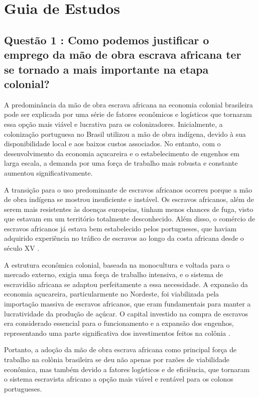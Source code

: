 \documentclass[a4paper,12pt]{article}[abntex2]
\begin{document}
\newpage
\section{\textbf{Guia de Estudos}}

\subsection{\textbf{Questão 1 : Como podemos justificar o emprego da mão de obra escrava africana ter se tornado a mais importante na etapa colonial?}}

A predominância da mão de obra escrava africana na economia colonial brasileira pode ser explicada por uma série de fatores econômicos e logísticos que tornaram essa opção mais viável e lucrativa para os colonizadores. Inicialmente, a colonização portuguesa no Brasil utilizou a mão de obra indígena, devido à sua disponibilidade local e aos baixos custos associados. No entanto, com o desenvolvimento da economia açucareira e o estabelecimento de engenhos em larga escala, a demanda por uma força de trabalho mais robusta e constante aumentou significativamente.

A transição para o uso predominante de escravos africanos ocorreu porque a mão de obra indígena se mostrou insuficiente e instável. Os escravos africanos, além de serem mais resistentes às doenças europeias, tinham menos chances de fuga, visto que estavam em um território totalmente desconhecido. Além disso, o comércio de escravos africanos já estava bem estabelecido pelos portugueses, que haviam adquirido experiência no tráfico de escravos ao longo da costa africana desde o século XV .

A estrutura econômica colonial, baseada na monocultura e voltada para o mercado externo, exigia uma força de trabalho intensiva, e o sistema de escravidão africana se adaptou perfeitamente a essa necessidade. A expansão da economia açucareira, particularmente no Nordeste, foi viabilizada pela importação massiva de escravos africanos, que eram fundamentais para manter a lucratividade da produção de açúcar. O capital investido na compra de escravos era considerado essencial para o funcionamento e a expansão dos engenhos, representando uma parte significativa dos investimentos feitos na colônia .

Portanto, a adoção da mão de obra escrava africana como principal força de trabalho na colônia brasileira se deu não apenas por razões de viabilidade econômica, mas também devido a fatores logísticos e de eficiência, que tornaram o sistema escravista africano a opção mais viável e rentável para os colonos portugueses.
\end{document}
